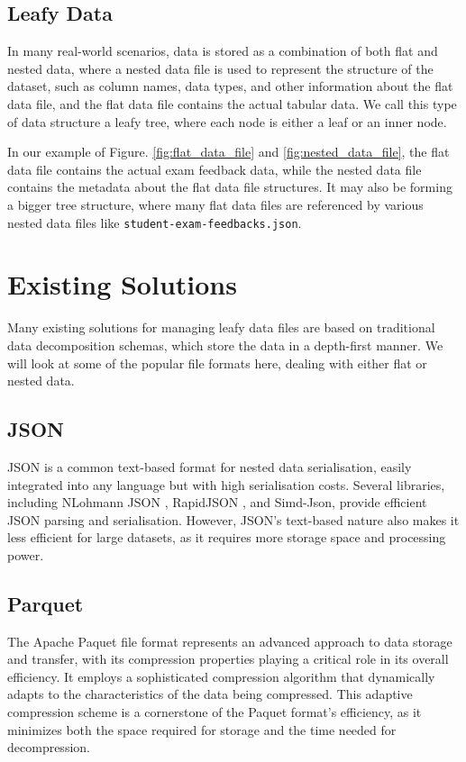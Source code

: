 \subsection{Leafy Data}

In many real-world scenarios, data is stored as a combination of both flat and nested data, where a nested data file is used to represent the structure of the dataset, such as column names, data types, and other information about the flat data file, and the flat data file contains the actual tabular data. We call this type of data structure a leafy tree, where each node is either a leaf or an inner node. 

In our example of Figure. \ref{fig:flat_data_file} and \ref{fig:nested_data_file}, the flat data file contains the actual exam feedback data, while the nested data file contains the metadata about the flat data file structures. It may also be forming a bigger tree structure, where many flat data files are referenced by various nested data files like \texttt{student-exam-feedbacks.json}.


\section{Existing Solutions}

Many existing solutions for managing leafy data files are based on traditional data decomposition schemas, which store the data in a depth-first manner. We will look at some of the popular file formats here, dealing with either flat or nested data.  

\subsection{JSON}

JSON is a common text-based format for nested data serialisation, easily integrated into any language but with high serialisation costs. Several libraries, including NLohmann JSON \cite{nlohmann_json}, RapidJSON \cite{rapidjson}, and Simd-Json\cite{langdale2019parsing}, provide efficient JSON parsing and serialisation. However, JSON's text-based nature also makes it less efficient for large datasets, as it requires more storage space and processing power.

\subsection{Parquet}

The Apache Paquet file format \cite{apache_parquet} represents an advanced approach to data storage and transfer, with its compression properties playing a critical role in its overall efficiency. It employs a sophisticated compression algorithm that dynamically adapts to the characteristics of the data being compressed. This adaptive compression scheme is a cornerstone of the Paquet format's efficiency, as it minimizes both the space required for storage and the time needed for decompression. 

